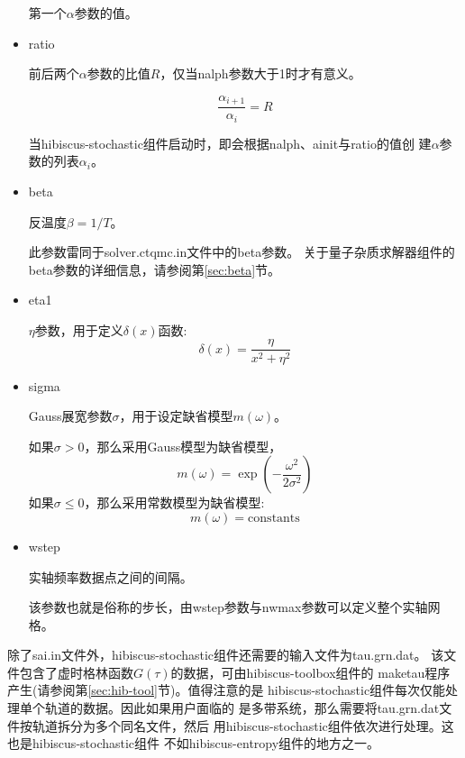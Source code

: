\begin{itemize}
第一个$\alpha$参数的值。

\item {\color{red}ratio}

前后两个$\alpha$参数的比值$R$，仅当nalph参数大于1时才有意义。

\begin{equation}
\frac{\alpha_{i+1}}{\alpha_{i}} = R
\end{equation}

当hibiscus-stochastic组件启动时，即会根据nalph、ainit与ratio的值创
建$\alpha$参数的列表$\alpha_{i}$。

\item {\color{red}beta}

反温度$\beta = 1/T$。

此参数雷同于solver.ctqmc.in文件中的beta参数。
关于量子杂质求解器组件的beta参数的详细信息，请参阅第\ref{sec:beta}节。

\item {\color{red}eta1}

$\eta$参数，用于定义$\delta(x)$函数:
\begin{equation}
\delta(x) = \frac{\eta}{x^{2} + \eta^{2}}
\end{equation}

\item {\color{red}sigma}

Gauss展宽参数$\sigma$，用于设定缺省模型$m(\omega)$。

如果$\sigma > 0$，那么采用Gauss模型为缺省模型，
\begin{equation}
m(\omega) = \exp{\left(-\frac{\omega^{2}}{2\sigma^{2}}\right)}
\end{equation}
如果$\sigma \leq 0$，那么采用常数模型为缺省模型:
\begin{equation}
m(\omega) = \text{constants}
\end{equation}

\item {\color{red}wstep}

实轴频率数据点之间的间隔。

该参数也就是俗称的步长，由wstep参数与nwmax参数可以定义整个实轴网格。

\end{itemize}

除了sai.in文件外，hibiscus-stochastic组件还需要的输入文件为tau.grn.dat。
该文件包含了虚时格林函数$G(\tau)$的数据，可由hibiscus-toolbox组件的
maketau程序产生(请参阅第\ref{sec:hib-tool}节)。值得注意的是
hibiscus-stochastic组件每次仅能处理单个轨道的数据。因此如果用户面临的
是多带系统，那么需要将tau.grn.dat文件按轨道拆分为多个同名文件，然后
用hibiscus-stochastic组件依次进行处理。这也是hibiscus-stochastic组件
不如hibiscus-entropy组件的地方之一。

